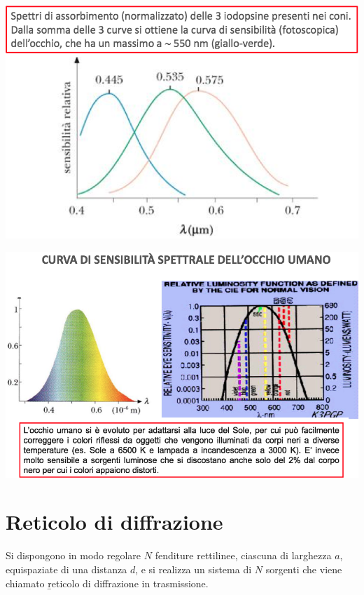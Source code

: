 \begin{center}
\includegraphics[width=\textwidth]{immagini/assorbimentoiodopsine.png}
\end{center}
\begin{center}
\includegraphics[width=\textwidth]{immagini/curvasensibilityocchio.png}
\end{center}

\section{Reticolo di diffrazione}%
Si dispongono in modo regolare $N$ fenditure rettilinee, ciascuna di larghezza $a$, equispaziate di una distanza $d$, e si realizza un sistema di $N$ sorgenti che viene chiamato \b{reticolo di diffrazione in trasmissione}.

